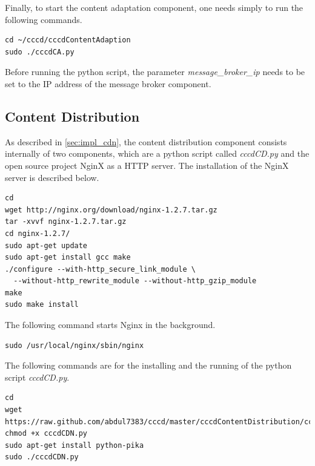 Finally, to start the content adaptation component, one needs simply to run the following commands.

\begin{code}
\begin{verbatim}
cd ~/cccd/cccdContentAdaption
sudo ./cccdCA.py
\end{verbatim}
\end{code}

Before running the python script, the parameter \textit{message\_broker\_ip} needs to be set to the IP address of the message broker component.

\subsection{Content Distribution\label{sec:eval_te_cd}}
As described in \ref{sec:impl_cdn}, the content distribution component consists internally of two components, which are a python script called \textit{cccdCD.py} and the open source project NginX as a \ac{HTTP} server. The installation of the NginX server is described below.

\begin{code}
\begin{verbatim}
cd
wget http://nginx.org/download/nginx-1.2.7.tar.gz
tar -xvvf nginx-1.2.7.tar.gz 
cd nginx-1.2.7/
sudo apt-get update
sudo apt-get install gcc make
./configure --with-http_secure_link_module \
  --without-http_rewrite_module --without-http_gzip_module
make
sudo make install
\end{verbatim}
\end{code}

The following command starts Nginx in the background.

\begin{code}
\begin{verbatim}
sudo /usr/local/nginx/sbin/nginx
\end{verbatim}
\end{code}

The following commands are for the installing and the running of the python script \textit{cccdCD.py}.

\begin{code}
\begin{verbatim}
cd
wget https://raw.github.com/abdul7383/cccd/master/cccdContentDistribution/cccdCDN.py
chmod +x cccdCDN.py
sudo apt-get install python-pika
sudo ./cccdCDN.py
\end{verbatim}
\end{code}

